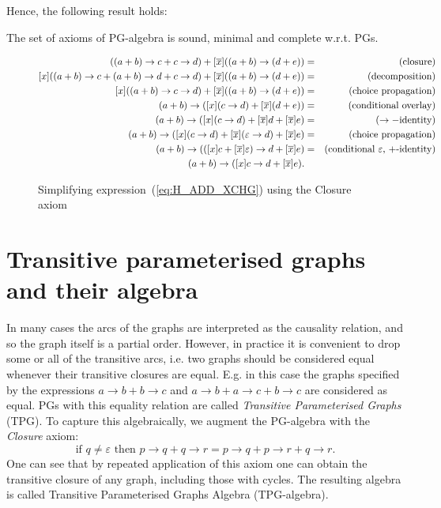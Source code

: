 Hence, the following result holds:
\begin{thm}
 The set of axioms of PG-algebra
is sound, minimal and complete w.r.t. PGs.
\end{thm}
\begin{figure}
\begin{eqnarray*}
[x]((a+b)\rightarrow c+c\rightarrow d)+[\overline{x}]((a+b)\rightarrow(d+e)) & = & (\textrm{closure)}\\
{}[x]((a+b)\rightarrow c+(a+b)\rightarrow d+c\rightarrow d)+[\overline{x}]((a+b)\rightarrow(d+e)) & = & (\textrm{decomposition)}\\
{}[x]((a+b)\rightarrow c\rightarrow d)+[\overline{x}]((a+b)\rightarrow(d+e)) & = & (\textrm{choice propagation)}\\
(a+b)\rightarrow([x](c\rightarrow d)+[\overline{x}](d+e)) & = & (\textrm{conditional overlay)}\\
(a+b)\rightarrow([x](c\rightarrow d)+[\overline{x}]d+[\overline{x}]e) & = & (\rightarrow-\textrm{identity)}\\
(a+b)\rightarrow([x](c\rightarrow d)+[\overline{x}](\varepsilon\rightarrow d)+[\overline{x}]e) & = & (\textrm{choice propagation)}\\
(a+b)\rightarrow(([x]c+[\overline{x}]\varepsilon)\rightarrow d+[\overline{x}]e) & = & (\textrm{conditional \ensuremath{\varepsilon}, +-\textrm{identity)}}\\
(a+b)\rightarrow([x]c\rightarrow d+[\overline{x}]e).
\end{eqnarray*}


\caption{Simplifying expression~(\ref{eq:H_ADD_XCHG}) using the Closure axiom\label{fig:Simplifying-TPG-expressions}}
\end{figure}



\section{Transitive parameterised graphs and their algebra}

In many cases the arcs of the graphs are interpreted as the causality
relation, and so the graph itself is a partial order. However, in
practice it is convenient to drop some or all of the transitive arcs,
i.e. two graphs should be considered equal whenever their transitive
closures are equal. E.g. in this case the graphs specified by the
expressions $a\rightarrow b+b\rightarrow c$ and $a\rightarrow b+a\rightarrow c+b\rightarrow c$
are considered as equal. PGs with this equality relation are called
\emph{Transitive Parameterised Graphs} (TPG). To capture this algebraically,
we augment the PG-algebra with the \emph{Closure} axiom:
\[
\mbox{{if\ }}q\neq\varepsilon\mbox{{\ then\ }}p\!\rightarrow\! q+q\!\rightarrow\! r=p\!\rightarrow\! q+p\!\rightarrow\! r+q\!\rightarrow\! r.
\]
One can see that by repeated application of this axiom one can obtain
the transitive closure of any graph, including those with cycles.
The resulting algebra is called Transitive Parameterised Graphs Algebra
(TPG-algebra).

